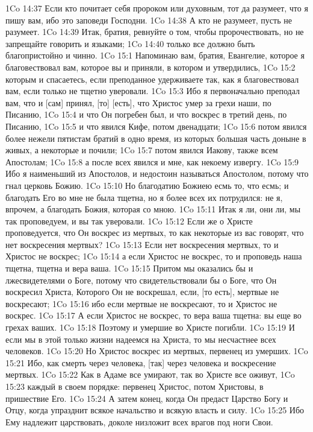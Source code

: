 1Co 14:37  Если кто почитает себя пророком или духовным, тот да разумеет, что я пишу вам, ибо это заповеди Господни.
1Co 14:38  А кто не разумеет, пусть не разумеет.
1Co 14:39  Итак, братия, ревнуйте о том, чтобы пророчествовать, но не запрещайте говорить и языками;
1Co 14:40  только все должно быть благопристойно и чинно.
1Co 15:1  Напоминаю вам, братия, Евангелие, которое я благовествовал вам, которое вы и приняли, в котором и утвердились,
1Co 15:2  которым и спасаетесь, если преподанное удерживаете так, как я благовествовал вам, если только не тщетно уверовали.
1Co 15:3  Ибо я первоначально преподал вам, что и [сам] принял, [то] [есть], что Христос умер за грехи наши, по Писанию,
1Co 15:4  и что Он погребен был, и что воскрес в третий день, по Писанию,
1Co 15:5  и что явился Кифе, потом двенадцати;
1Co 15:6  потом явился более нежели пятистам братий в одно время, из которых большая часть доныне в живых, а некоторые и почили;
1Co 15:7  потом явился Иакову, также всем Апостолам;
1Co 15:8  а после всех явился и мне, как некоему извергу.
1Co 15:9  Ибо я наименьший из Апостолов, и недостоин называться Апостолом, потому что гнал церковь Божию.
1Co 15:10  Но благодатию Божиею есмь то, что есмь; и благодать Его во мне не была тщетна, но я более всех их потрудился: не я, впрочем, а благодать Божия, которая со мною.
1Co 15:11  Итак я ли, они ли, мы так проповедуем, и вы так уверовали.
1Co 15:12  Если же о Христе проповедуется, что Он воскрес из мертвых, то как некоторые из вас говорят, что нет воскресения мертвых?
1Co 15:13  Если нет воскресения мертвых, то и Христос не воскрес;
1Co 15:14  а если Христос не воскрес, то и проповедь наша тщетна, тщетна и вера ваша.
1Co 15:15  Притом мы оказались бы и лжесвидетелями о Боге, потому что свидетельствовали бы о Боге, что Он воскресил Христа, Которого Он не воскрешал, если, [то есть], мертвые не воскресают;
1Co 15:16  ибо если мертвые не воскресают, то и Христос не воскрес.
1Co 15:17  А если Христос не воскрес, то вера ваша тщетна: вы еще во грехах ваших.
1Co 15:18  Поэтому и умершие во Христе погибли.
1Co 15:19  И если мы в этой только жизни надеемся на Христа, то мы несчастнее всех человеков.
1Co 15:20  Но Христос воскрес из мертвых, первенец из умерших.
1Co 15:21  Ибо, как смерть через человека, [так] через человека и воскресение мертвых.
1Co 15:22  Как в Адаме все умирают, так во Христе все оживут,
1Co 15:23  каждый в своем порядке: первенец Христос, потом Христовы, в пришествие Его.
1Co 15:24  А затем конец, когда Он предаст Царство Богу и Отцу, когда упразднит всякое начальство и всякую власть и силу.
1Co 15:25  Ибо Ему надлежит царствовать, доколе низложит всех врагов под ноги Свои.
